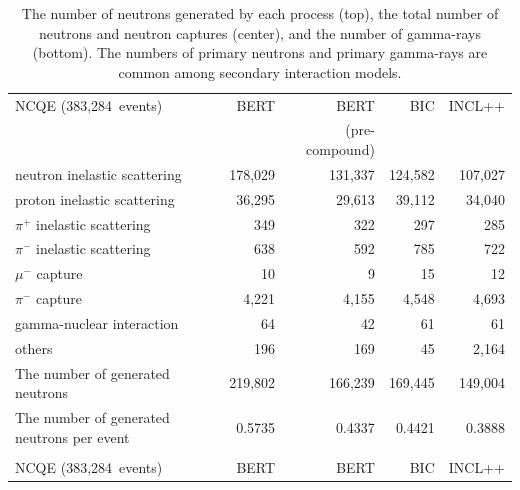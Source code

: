 \begin{table}[h]
	\centering
	\caption[The number of neutrons generated by each process, the total number of neutrons and neutron captures, and the number of gamma-rays]{
	The number of neutrons generated by each process (top), the total number of neutrons and neutron captures (center), and the number of gamma-rays (bottom).
	The numbers of primary neutrons and primary gamma-rays are common among secondary interaction models.
	}\label{tab:pre_gamma}
	\vs
	\begin{tabular}{lrrrr} \hline \hline
		NCQE (383,284~events)                               &    BERT &           BERT &     BIC &  INCL++ \\
		                                                    &         & (pre-compound) &         &         \\ \hline
		neutron inelastic scattering                        & 178,029 &        131,337 & 124,582 & 107,027 \\
		proton inelastic scattering                         &  36,295 &         29,613 &  39,112 &  34,040 \\
		$\pi^{+}$ inelastic scattering                      &     349 &            322 &     297 &     285 \\
		$\pi^{-}$ inelastic scattering                      &     638 &            592 &     785 &     722 \\
		$\mu^{-}$ capture                                   &      10 &              9 &      15 &      12 \\
		$\pi^{-}$ capture                                   &   4,221 &          4,155 &   4,548 &   4,693 \\
		gamma-nuclear interaction                           &      64 &             42 &      61 &      61 \\
		others                                              &     196 &            169 &      45 &   2,164 \\ \hline
		The number of generated neutrons                    & 219,802 &        166,239 & 169,445 & 149,004 \\ \hline
		The number of generated neutrons per event          &  0.5735 &         0.4337 &  0.4421 &  0.3888 \\ \hline \hline
		&&& \\ \hline \hline
		NCQE (383,284~events)                               &    BERT &           BERT &     BIC &  INCL++ \\

\end{tabular}
\end{table}
